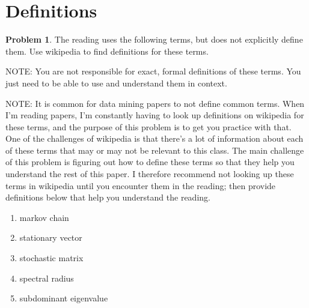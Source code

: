 \documentclass[10pt]{article}
\theoremstyle{definition}
\newtheorem{problem}{Problem}
\begin{document}
\newpage
\section{Definitions}

\begin{problem}
    The reading uses the following terms,
    but does not explicitly define them.
    Use wikipedia to find definitions for these terms.

    NOTE:
    You are not responsible for exact, formal definitions of these terms.
    You just need to be able to use and understand them in context.

    NOTE:
    It is common for data mining papers to not define common terms.
    When I'm reading papers, I'm constantly having to look up definitions on wikipedia for these terms,
    and the purpose of this problem is to get you practice with that.
    One of the challenges of wikipedia is that there's a lot of information about each of these terms that may or may not be relevant to this class.
    The main challenge of this problem is figuring out how to define these terms so that they help you understand the rest of this paper.
    I therefore recommend not looking up these terms in wikipedia until you encounter them in the reading;
    then provide definitions below that help you understand the reading.

    \begin{enumerate}
        \item markov chain
            \vspace{2.5in}
        \item stationary vector
            \vspace{2.5in}
        \item stochastic matrix
            \vspace{2.5in}
        \item spectral radius
            \vspace{2.5in}
        \item subdominant eigenvalue
    \end{enumerate}
\end{problem}
\end{document}
